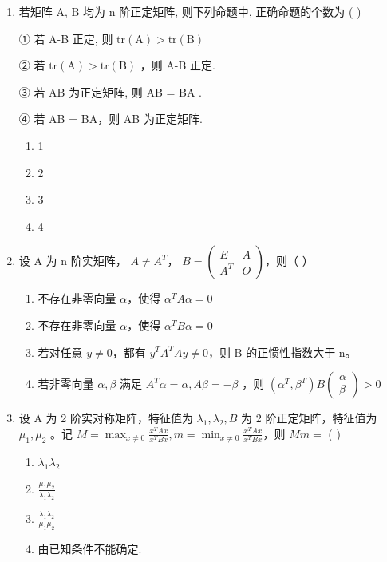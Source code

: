 \documentclass[12pt, a4paper]{ctexart}
\begin{document}
\begin{enumerate}
    \item 若矩阵 A, B 均为 n 阶正定矩阵, 则下列命题中, 正确命题的个数为 ( \underline{\hspace{1cm}} )
    
    ① 若 A-B 正定, 则 $ \mathrm{tr}(\mathrm{A}) > \mathrm{tr}(\mathrm{B}) $
    
    ② 若 $ \mathrm{tr}(\mathrm{A}) > \mathrm{tr}(\mathrm{B}) $ ，则 A-B 正定.
    
    ③ 若 AB 为正定矩阵, 则 AB = BA .
    
    ④ 若 AB = BA，则 AB 为正定矩阵.
    \begin{enumerate}[label=(\Alph*)]
        \item 1
        \item 2
        \item 3
        \item 4
    \end{enumerate}

    \item 设 A 为 n 阶实矩阵， $ A \neq A^{T} $， $ B = \begin{pmatrix} E & A \\ A^{T} & O \end{pmatrix} $，则（ \underline{\hspace{1cm}} ）
    \begin{enumerate}[label=(\Alph*)]
        \item 不存在非零向量 $ \alpha $，使得 $ \alpha^{T}A\alpha=0 $
        \item 不存在非零向量 $ \alpha $，使得 $ \alpha^{T}B\alpha=0 $
        \item 若对任意 $ y \neq 0 $，都有 $ y^{T}A^{T}Ay \neq 0 $，则 B 的正惯性指数大于 n。
        \item 若非零向量 $ \alpha, \beta $ 满足 $ A^{T}\alpha = \alpha, A\beta = -\beta $ ，则 $ \left(\alpha^{T}, \beta^{T}\right)B\begin{pmatrix} \alpha \\ \beta \end{pmatrix} > 0 $
    \end{enumerate}

    \item 设 A 为 2 阶实对称矩阵，特征值为 $ \lambda_{1}, \lambda_{2}, B $ 为 2 阶正定矩阵，特征值为 $ \mu_{1}, \mu_{2} $ 。记 $ M = \max_{x \neq 0} \frac{x^{T} A x}{x^{T} B x}, m = \min_{x \neq 0} \frac{x^{T} A x}{x^{T} B x} $，则 $ M m = $ ( \underline{\hspace{1cm}} )
    \begin{enumerate}[label=(\Alph*)]
        \item $ \lambda_{1}\lambda_{2} $
        \item $ \frac{\mu_{1}\mu_{2}}{\lambda_{1}\lambda_{2}} $
        \item $ \frac{\lambda_{1}\lambda_{2}}{\mu_{1}\mu_{2}} $
        \item 由已知条件不能确定.
    \end{enumerate}
\end{enumerate}
\end{document}
